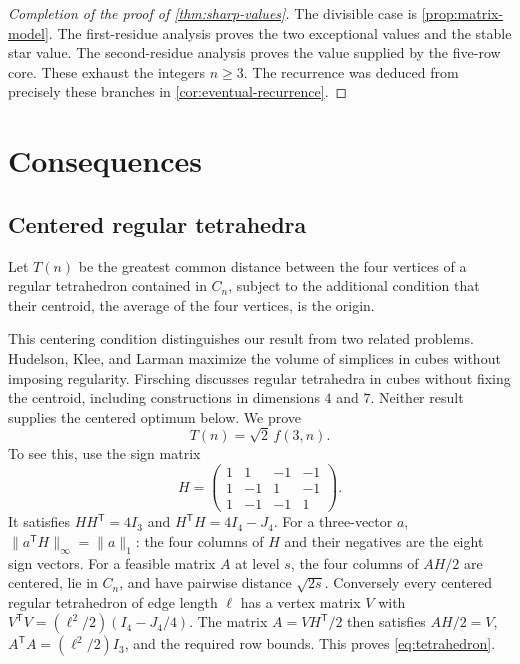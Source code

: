\documentclass[11pt]{article}
\numberwithin{equation}{section}
\theoremstyle{definition}
\theoremstyle{definition}
\newcommand{\norm}[1]{\lVert#1\rVert}
\begin{document}
\begin{proof}[Completion of the proof of \cref{thm:sharp-values}]
The divisible case is \cref{prop:matrix-model}. The first-residue
analysis proves the two exceptional values and the stable star value.
The second-residue analysis proves the value supplied by the five-row
core. These exhaust the integers $n\ge3$. The recurrence was deduced
from precisely these branches in \cref{cor:eventual-recurrence}.
\end{proof}

\section{Consequences}
\label{sec:consequences}
\subsection{Centered regular tetrahedra}
Let $T(n)$ be the greatest common distance between the four vertices
of a regular tetrahedron contained in $C_n$, subject to the additional
condition that their centroid, the average of the four vertices,
is the origin.

This centering condition distinguishes our result from two related
problems. Hudelson, Klee, and Larman \cite{HudelsonKleeLarman1996}
maximize the volume of simplices in cubes without imposing regularity.
Firsching \cite{Firsching2017} discusses regular tetrahedra in cubes
without fixing the centroid, including constructions in dimensions
$4$ and $7$. Neither result supplies the centered optimum below.
We prove
\begin{equation}\label{eq:tetrahedron}
 T(n)=\sqrt2\,f(3,n).
\end{equation}
To see this, use the sign matrix
\[
 H=\begin{pmatrix}
 1&1&-1&-1\\
 1&-1&1&-1\\
 1&-1&-1&1
 \end{pmatrix}.
\]
It satisfies $HH^{\mathsf T}=4I_3$ and
$H^{\mathsf T}H=4I_4-J_4$. For a three-vector $a$,
$\norm{a^{\mathsf T}H}_\infty=\norm a_1$: the four columns of $H$
and their negatives are the eight sign vectors.
For a feasible matrix $A$ at level $s$, the four columns of $AH/2$
are centered, lie in $C_n$, and have pairwise distance $\sqrt{2s}$.
Conversely every centered regular tetrahedron of edge length $\ell$
has a vertex matrix $V$ with
$V^{\mathsf T}V=(\ell^2/2)(I_4-J_4/4)$. The matrix
$A=VH^{\mathsf T}/2$ then satisfies $AH/2=V$,
$A^{\mathsf T}A=(\ell^2/2)I_3$, and the required row bounds.
This proves \eqref{eq:tetrahedron}.
\end{document}
